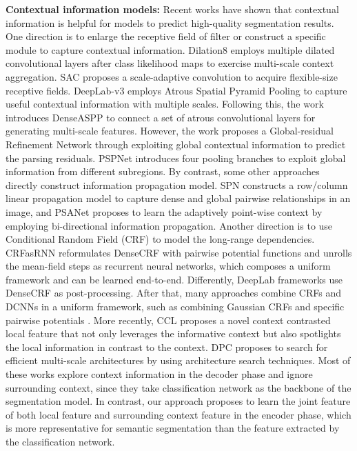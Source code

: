 \documentclass[10pt,twocolumn,letterpaper]{article}
\begin{document}
\textbf{Contextual information models:}\quad
Recent works \cite{chen2017rethinking,Ding_2018_CVPR,Yu_2018_CVPR,zhang2018context} have shown that contextual information is helpful for models to predict high-quality segmentation results. One direction is to enlarge the receptive field of filter or construct a specific module to capture contextual information. Dilation8 \cite{yu2015multi} employs multiple dilated convolutional layers after class likelihood maps to exercise multi-scale context aggregation. SAC \cite{zhang2017scale}  proposes a scale-adaptive convolution to acquire flexible-size receptive fields. DeepLab-v3 \cite{chen2017rethinking} employs  Atrous Spatial Pyramid Pooling \cite{chen2016deeplab} to capture useful contextual information with multiple scales. Following this, the work \cite{yang2018denseaspp} introduces DenseASPP to connect a set of atrous convolutional layers for generating multi-scale features. However, the work \cite{zhang2017global} proposes a Global-residual Refinement Network through exploiting global contextual information to predict the parsing residuals. PSPNet \cite{Zhao_2017_CVPR} introduces four pooling branches to exploit global information from different subregions. By contrast, some other approaches directly construct information propagation model. SPN \cite{liu2017learning} constructs a row/column linear propagation model to capture dense and global pairwise relationships in an image, and PSANet \cite{Zhao_2018_ECCV} proposes to learn the adaptively point-wise context by employing bi-directional information propagation. Another direction is to use Conditional Random Field (CRF) to model the long-range dependencies.  CRFasRNN \cite{zheng2015conditional} reformulates DenseCRF with pairwise potential functions and unrolls the mean-field steps as recurrent neural networks, which composes a uniform framework and can be learned end-to-end. Differently, DeepLab frameworks \cite{chen2016deeplab} use DenseCRF \cite{krahenbuhl2011efficient} as post-processing. After that, many approaches combine CRFs and DCNNs in a uniform framework, such as combining Gaussian CRFs \cite{chandra2016fast} and specific pairwise potentials \cite{jampani2016learning}. More recently, CCL \cite{Ding_2018_CVPR} proposes a novel context contrasted local feature that not only leverages the informative context but also spotlights the local information in contrast to the context. DPC \cite{chen2018searching} proposes to search for efficient multi-scale architectures by using architecture search techniques. Most of these works explore context information in the decoder phase and ignore surrounding context, since they take classification network as the backbone of the segmentation model. In contrast, our approach proposes to learn the joint feature of both local feature and surrounding context feature in the encoder phase, which is more representative for semantic segmentation than the feature extracted by the classification network.
\end{document}
